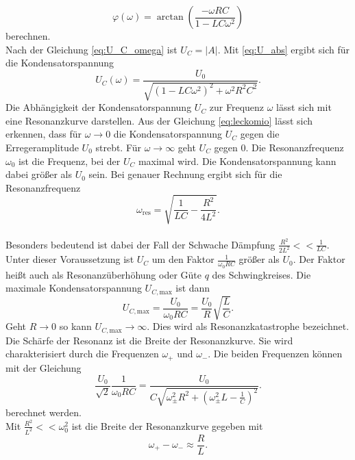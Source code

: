 \begin{equation}\label{eq:phi}
    φ(ω) = \arctan{\left(\frac{-ωRC}{1 - LCω^2}\right)}
\end{equation} berechnen.\\
Nach der Gleichung \eqref{eq:U_C_omega} ist $U_C = |A|.$ Mit \autoref{eq:U_abs} ergibt sich für die Kondensatorspannung
\begin{equation}\label{eq:leckomio}
    U_C(ω) = \frac{U_0}{\sqrt{\left(1 - LCω^2\right)^2 + ω^2R^2C^2}}.
\end{equation}
Die Abhängigkeit der Kondensatorspannung $U_C$ zur Frequenz $ω$ lässt sich mit eine Resonanzkurve darstellen.
Aus der Gleichung \eqref{eq:leckomio} lässt sich erkennen, dass für $ω \longrightarrow 0$ die Kondensatorspannung $U_C$ gegen die Erregeramplitude $U_0$ strebt.
Für $ω \longrightarrow \infty$ geht $U_C$ gegen $0.$
Die Resonanzfrequenz $ω_0$ ist die Frequenz, bei der $U_C$ maximal wird. Die Kondensatorspannung kann dabei größer als $U_0$ sein.
Bei genauer Rechnung ergibt sich für die Resonanzfrequenz
\begin{equation}\label{eq:wres}
    ω_{\text{res}} = \sqrt{\frac{1}{LC} - \frac{R^2}{4L^2}}.
\end{equation}\\
Besonders bedeutend ist dabei der Fall der Schwache Dämpfung $\frac{R^2}{2L^2} << \frac{1}{LC}.$\\
Unter dieser Voraussetzung ist $U_C$ um den Faktor $\frac{1}{ω_0RC}$ größer als $U_0.$ Der Faktor heißt auch als Resonanzüberhöhung oder Güte $q$ des Schwingkreises.
Die maximale Kondensatorspannung $U_{C,\text{max}}$ ist dann
\begin{equation*}
    U_{C,\text{max}} = \frac{U_0}{ω_0RC} = \frac{U_0}{R}\sqrt{\frac{L}{C}}.
\end{equation*}
Geht $R \longrightarrow 0$ so kann $U_{C,\text{max}} \longrightarrow \infty.$ Dies wird als Resonanzkatastrophe bezeichnet.\\
Die Schärfe der Resonanz ist die Breite der Resonanzkurve. Sie wird charakterisiert durch die Frequenzen $ω_+$ und $ω_-$.
Die beiden Frequenzen können mit der Gleichung
\begin{equation*}
    \frac{U_0}{\sqrt{2}} \frac{1}{ω_0RC} = \frac{U_0}{C\sqrt{ω_{\pm}^2R^2 + \left(ω_{\pm}^2L - \frac{1}{C}\right)^2}}.
\end{equation*}
berechnet werden.\\
Mit $\frac{R^2}{L^2} << ω_0^2$ ist die Breite der Resonanzkurve gegeben mit
\begin{equation}\label{eq:gute}
    ω_+ - ω_- \approx \frac{R}{L}.
\end{equation}
